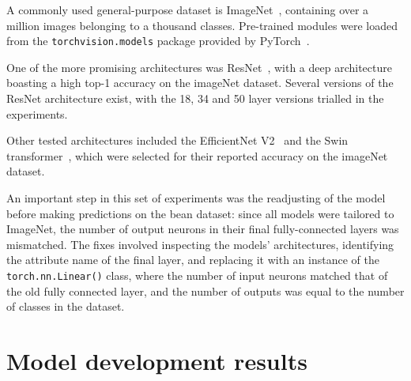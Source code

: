 A commonly used general-purpose dataset is ImageNet~\cite{imageNet}, containing over a million images belonging to a thousand
classes.
Pre-trained modules were loaded from the \verb|torchvision.models| package provided by PyTorch~\cite{pytorchLibrary}.

One of the more promising architectures was ResNet~\cite{resNet}, with a deep architecture boasting a high top-1 accuracy on the imageNet dataset.
Several versions of the ResNet architecture exist, with the 18, 34 and 50 layer versions trialled in the experiments.

Other tested architectures included the EfficientNet V2~\cite{efficientNet} and the Swin transformer~\cite{swinTransformer},
which were selected for their reported accuracy on the imageNet dataset.

An important step in this set of experiments was the readjusting of the model before making predictions on the bean dataset:
since all models were tailored to ImageNet, the number of output neurons in their final fully-connected layers was mismatched.
The fixes involved inspecting the models' architectures, identifying the attribute name of the final layer, and replacing it with an
instance of the \verb|torch.nn.Linear()| class, where the number of input neurons matched that of the old fully connected layer,
and the number of outputs was equal to the number of classes in the dataset.

\section{Model development results}
\label{sec:model-development-results}